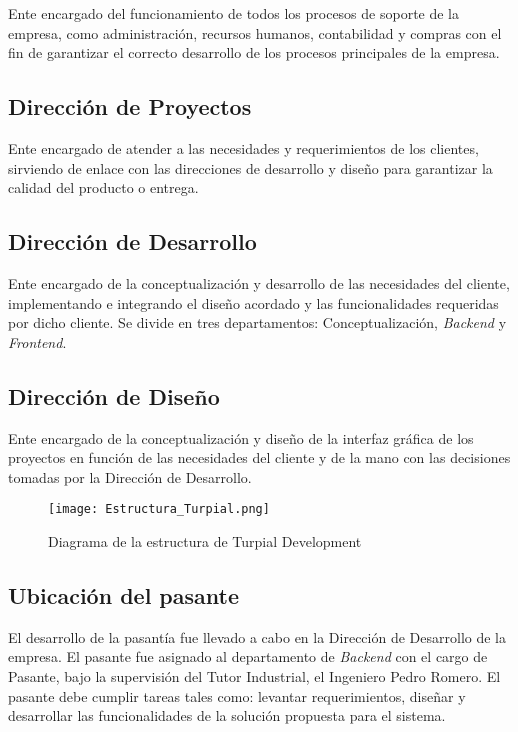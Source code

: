 Ente encargado del funcionamiento de todos los procesos de soporte de la empresa, como administración, recursos humanos, contabilidad y compras con el fin de garantizar el correcto desarrollo de los procesos principales de la empresa.

\subsection*{Dirección de Proyectos}

Ente encargado de atender a las necesidades y requerimientos de los clientes, sirviendo de enlace con las direcciones de desarrollo y diseño para garantizar la calidad del producto o entrega.

\subsection*{Dirección de Desarrollo}

Ente encargado de la conceptualización y desarrollo de las necesidades del cliente, implementando e integrando el diseño acordado y las funcionalidades requeridas por dicho cliente. Se divide en tres departamentos: Conceptualización, \textit{Backend} y \textit{Frontend}.

\subsection*{Dirección de Diseño}

Ente encargado de la conceptualización y diseño de la interfaz gráfica de los proyectos en función de las necesidades del cliente y de la mano con las decisiones tomadas por la Dirección de Desarrollo.

\begin{figure}[h]
\centering
\texttt{[image: Estructura\_Turpial.png]}
\caption{Diagrama de la estructura de Turpial Development}
\label{fig:figura1.1}
\end{figure}

\subsection*{Ubicación del pasante}

El desarrollo de la pasantía fue llevado a cabo en la Dirección de Desarrollo de la empresa. El pasante fue asignado al departamento de \textit{Backend} con el cargo de Pasante, bajo la supervisión del Tutor Industrial, el Ingeniero Pedro Romero. El pasante debe cumplir tareas tales como: levantar requerimientos, diseñar y desarrollar las funcionalidades de la solución propuesta para el sistema.
